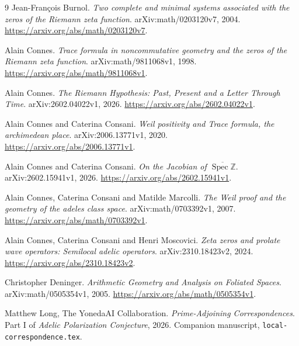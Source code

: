 \documentclass[11pt,letterpaper]{article}
\theoremstyle{definition}
\theoremstyle{remark}
\newcommand{\Z}{\mathbb Z}
\begin{document}
\begin{thebibliography}{9}
\small
{}
Jean-Fran\c{c}ois Burnol.
\emph{Two complete and minimal systems associated with the zeros of the Riemann zeta function}.
arXiv:math/0203120v7, 2004.
\url{https://arxiv.org/abs/math/0203120v7}.

Alain Connes.
\emph{Trace formula in noncommutative geometry and the zeros of the Riemann zeta function}.
arXiv:math/9811068v1, 1998.
\url{https://arxiv.org/abs/math/9811068v1}.

Alain Connes.
\emph{The Riemann Hypothesis: Past, Present and a Letter Through Time}.
arXiv:2602.04022v1, 2026.
\url{https://arxiv.org/abs/2602.04022v1}.

Alain Connes and Caterina Consani.
\emph{Weil positivity and Trace formula, the archimedean place}.
arXiv:2006.13771v1, 2020.
\url{https://arxiv.org/abs/2006.13771v1}.

Alain Connes and Caterina Consani.
\emph{On the Jacobian of $\overline{\operatorname{Spec}\Z}$}.
arXiv:2602.15941v1, 2026.
\url{https://arxiv.org/abs/2602.15941v1}.

Alain Connes, Caterina Consani and Matilde Marcolli.
\emph{The Weil proof and the geometry of the adeles class space}.
arXiv:math/0703392v1, 2007.
\url{https://arxiv.org/abs/math/0703392v1}.

Alain Connes, Caterina Consani and Henri Moscovici.
\emph{Zeta zeros and prolate wave operators: Semilocal adelic operators}.
arXiv:2310.18423v2, 2024.
\url{https://arxiv.org/abs/2310.18423v2}.

Christopher Deninger.
\emph{Arithmetic Geometry and Analysis on Foliated Spaces}.
arXiv:math/0505354v1, 2005.
\url{https://arxiv.org/abs/math/0505354v1}.

Matthew Long, The YonedaAI Collaboration.
\emph{Prime-Adjoining Correspondences}.
Part I of \emph{Adelic Polarization Conjecture}, 2026.
Companion manuscript, \texttt{local-correspondence.tex}.
\end{thebibliography}
\end{document}
